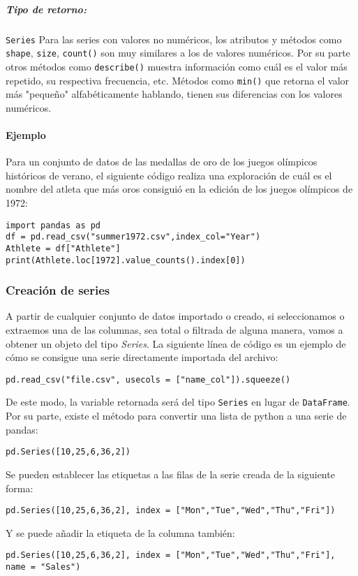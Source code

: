 \subparagraph{Tipo de retorno:} \texttt{Series}
Para las series con valores no numéricos, los atributos y métodos como \texttt{shape}, \texttt{size}, \texttt{count()} son muy similares a los de valores numéricos. Por su parte otros métodos como \texttt{describe()} muestra información como cuál es el valor más repetido, su respectiva frecuencia, etc.
Métodos como \texttt{min()} que retorna el valor más "pequeño" alfabéticamente hablando, tienen sus diferencias con los valores numéricos.
\paragraph{Ejemplo} Para un conjunto de datos de las medallas de oro de los juegos olímpicos históricos de verano, el siguiente código realiza una exploración de cuál es el nombre del atleta que más oros consiguió en la edición de los juegos olímpicos de 1972:
\begin{verbatim}
import pandas as pd
df = pd.read_csv("summer1972.csv",index_col="Year")
Athlete = df["Athlete"]
print(Athlete.loc[1972].value_counts().index[0])
\end{verbatim}
\subsubsection{Creación de series}
A partir de cualquier conjunto de datos importado o creado, si seleccionamos o extraemos una de las columnas, sea total o filtrada de alguna manera, vamos a obtener un objeto del tipo \textit{Series}. 
La siguiente línea de código es un ejemplo de cómo se consigue una serie directamente importada del archivo:
\begin{verbatim}
pd.read_csv("file.csv", usecols = ["name_col"]).squeeze()
\end{verbatim}
De este modo, la variable retornada será del tipo \texttt{Series} en lugar de \texttt{DataFrame}. 
Por su parte, existe el método para convertir una lista de python a una serie de pandas:
\begin{verbatim}
pd.Series([10,25,6,36,2])
\end{verbatim}
Se pueden establecer las etiquetas a las filas de la serie creada de la siguiente forma:
\begin{verbatim}
pd.Series([10,25,6,36,2], index = ["Mon","Tue","Wed","Thu","Fri"])
\end{verbatim}
Y se puede añadir la etiqueta de la columna también:
\begin{verbatim}
pd.Series([10,25,6,36,2], index = ["Mon","Tue","Wed","Thu","Fri"], name = "Sales")
\end{verbatim}
